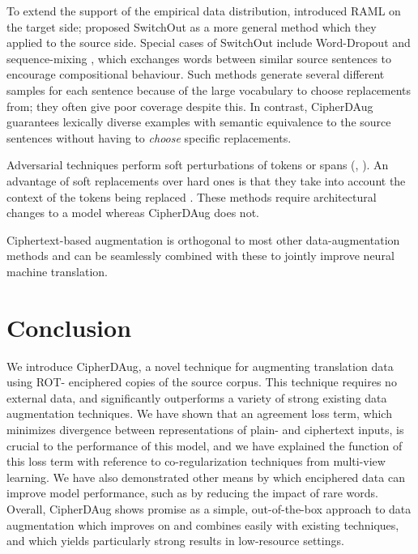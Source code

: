 \documentclass[11pt]{article}
\begin{document}
To extend the support of the empirical data distribution, \citet{Norouzi2016RewardAM} introduced RAML on the target side; \citet{wang-etal-2018-switchout} proposed SwitchOut as a more general method which they applied to the source side. Special cases of SwitchOut include Word-Dropout and sequence-mixing \cite{guo-etal-2020-sequence}, which exchanges words between similar source sentences to encourage compositional behaviour. Such methods generate several different samples for each sentence because of the large vocabulary to choose replacements from; they often give poor coverage despite this. In contrast, CipherDAug guarantees lexically diverse examples with semantic equivalence to the source sentences without having to \emph{choose} specific replacements.

Adversarial techniques \cite{gao-etal-2019-soft} perform soft perturbations of tokens or spans (\hbox{\citealt{takase-kiyono-2021-rethinking}}, \citealt{karpukhin-etal-2019-training}). An advantage of soft replacements over hard ones is that they take into account the context of the tokens being replaced \cite{liu-etal-2021-counterfactual, mohiuddin-etal-2021-augvic}. These methods require architectural changes to a model whereas CipherDAug does not. 

Ciphertext-based augmentation is orthogonal to most other data-augmentation methods and can be seamlessly combined with these to jointly improve neural machine translation.

\section{Conclusion}
We introduce CipherDAug, a novel technique for augmenting translation data using ROT- enciphered copies of the source corpus. This technique requires no external data, and significantly outperforms a variety of strong existing data augmentation techniques.
We have shown that an agreement loss term, which minimizes divergence between representations of plain- and ciphertext inputs, is crucial to the performance of this model, and we have explained the function of this loss term with reference to co-regularization techniques from multi-view learning.
We have also demonstrated other means by which enciphered data can improve model performance, such as by reducing the impact of rare words. Overall, CipherDAug shows promise as a simple, out-of-the-box approach to data augmentation which improves on and combines easily with existing techniques, and which yields particularly strong results in low-resource settings.
\end{document}
